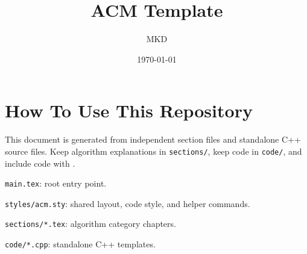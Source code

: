 \documentclass[10pt,a4paper]{ctexart}
\title{ACM Template}
\author{MKD}
\date{\today}
\begin{document}
\maketitle
\tableofcontents

\section*{How To Use This Repository}

This document is generated from independent section files and standalone C++
source files. Keep algorithm explanations in \texttt{sections/}, keep code in
\texttt{code/}, and include code with \verb||.

\begin{CompactItemize}
  \item \texttt{main.tex}: root entry point.
  \item \texttt{styles/acm.sty}: shared layout, code style, and helper commands.
  \item \texttt{sections/*.tex}: algorithm category chapters.
  \item \texttt{code/*.cpp}: standalone C++ templates.
\end{CompactItemize}




\end{document}
